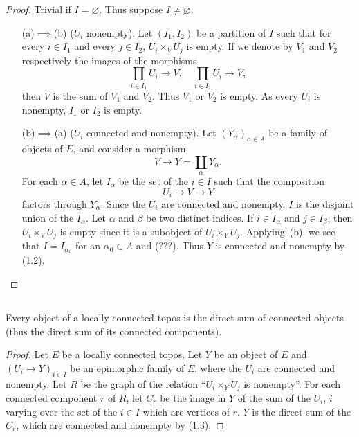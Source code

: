 \documentclass[10pt,oneside]{amsart}
\newcommand{\oldpage}[1]{\marginnote{\textbf{#1}}}
\begin{document}
\begin{proof}
Trivial if $I=\varnothing$.
Thus suppose $I\neq\varnothing$.
\begin{enumerate}
  \item[(a)$\implies$(b)] ($U_i$ nonempty). Let $(I_1,I_2)$ be a partition of $I$ such that for every $i\in I_1$ and every $j\in I_2$, $U_i\times_V U_j$ is empty.
    If we denote by $V_1$ and $V_2$ respectively the images of the morphisms
    \[
      \prod_{i\in I_1}U_i\longrightarrow V,\quad\prod_{i\in I_2}U_i\longrightarrow V,
    \]
    then $V$ is the sum of $V_1$ and $V_2$.
    Thus $V_1$ or $V_2$ is empty.
    As every $U_i$ is nonempty, $I_1$ or $I_2$ is empty.
  \item[(b)$\implies$(a)] ($U_i$ connected and nonempty). Let $(Y_\alpha)_{\alpha\in A}$ be a family of objects of $E$, and consider a morphism
    \[
      V\longrightarrow Y=\coprod_\alpha Y_\alpha.
    \]
    For each $\alpha\in A$, let $I_\alpha$ be the set of the $i\in I$ such that the composition
    \[
      U_i\longrightarrow V\longrightarrow Y
    \]
    factors through $Y_\alpha$.
    Since the $U_i$ are connected and nonempty, $I$ is the disjoint union of the $I_\alpha$.
    Let $\alpha$ and $\beta$ be two distinct indices.
    If $i\in I_\alpha$ and $j\in I_\beta$, then $U_i\times_V U_j$ is empty since it is a subobject of $U_i\times_Y U_j$.
    Applying~(b), we see that $I=I_{\alpha_0}$ for an $\alpha_0\in A$ and (???).
    Thus $Y$ is connected and nonempty by (1.2).
\end{enumerate}
\end{proof}

\subsection{}
\oldpage{3}
Every object of a locally connected topos is the direct sum of connected objects (thus the direct sum of its connected components).

\begin{proof}
Let $E$ be a locally connected topos.
Let $Y$ be an object of $E$ and $(U_i\to Y)_{i\in I}$ be an epimorphic family of $E$, where the $U_i$ are connected and nonempty.
Let $R$ be the graph of the relation ``$U_i\times_Y U_j$ is nonempty''.
For each connected component $r$ of $R$, let $C_r$ be the image in $Y$ of the sum of the $U_i$, $i$ varying over the set of the $i\in I$ which are vertices of $r$.
$Y$ is the direct sum of the $C_r$, which are connected and nonempty by (1.3).
\end{proof}
\end{document}
